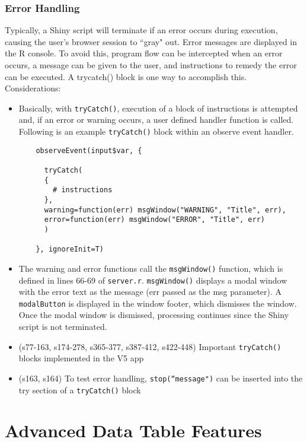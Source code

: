 \documentclass[10pt, letterpaper]{article}
\begin{document}
\begin{spacing}{1.0}
\subsubsection{Error Handling}

Typically, a Shiny script will terminate if an error occurs during execution, causing the user's browser session to ``gray" out.  Error messages are displayed in the R console.  To avoid this, program flow can be intercepted when an error occurs, a message can be given to the user, and instructions to remedy the error can be executed.  A trycatch() block is one way to accomplish this.  Considerations:

\begin{itemize}
    \item Basically, with \texttt{tryCatch()}, execution of a block of instructions is attempted and, if an error or warning occurs, a user defined handler function is called.  Following is an example \texttt{tryCatch()} block within an observe event handler.
    \footnotesize
    \begin{verbatim}
    observeEvent(input$var, {
    
      tryCatch(
      {
        # instructions
      },
      warning=function(err) msgWindow("WARNING", "Title", err),
      error=function(err) msgWindow("ERROR", "Title", err)
      )
    
    }, ignoreInit=T)
    \end{verbatim}
    \normalsize
    \item The warning and error functions call the \texttt{msgWindow()} function, which is defined in lines 66-69 of \texttt{server.r}.  \texttt{msgWindow()} displays a modal window with the error text as the message (err passed as the msg parameter).  A \texttt{modalButton} is displayed in the window footer, which dismisses the window.  Once the modal window is dismissed, processing continues since the Shiny script is not terminated.
    \item (s77-163, s174-278, s365-377, s387-412, s422-448) Important \texttt{tryCatch()} blocks implemented in the V5 app
    \item (s163, s164) To test error handling, \texttt{stop(``message")} can be inserted into the try section of a \texttt{tryCatch()} block
\end{itemize}


\section{Advanced Data Table Features}\label{sec:advtablefeatures}


\end{spacing}
\end{document}
